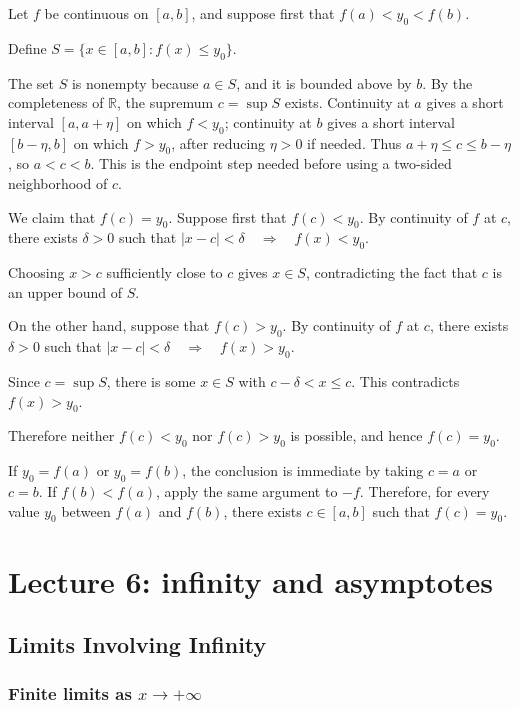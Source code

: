 \documentclass[11pt,a4paper]{article}
\begin{document}
Let \(f\) be continuous on \([a,b]\), and suppose first that
\(f(a)<y_0<f(b).\)

Define \(S=\{x\in[a,b]:f(x)\leq y_0\}.\)

The set \(S\) is nonempty because \(a\in S\), and it is bounded above by
\(b\). By the completeness of \(\mathbb{R}\), the supremum \(c=\sup S\)
exists. Continuity at \(a\) gives a short interval \([a,a+\eta]\) on
which \(f<y_0\); continuity at \(b\) gives a short interval
\([b-\eta,b]\) on which \(f>y_0\), after reducing \(\eta>0\) if needed.
Thus \(a+\eta\le c\le b-\eta\), so \(a<c<b\). This is the endpoint step
needed before using a two-sided neighborhood of \(c\).

We claim that \(f(c)=y_0\). Suppose first that \(f(c)<y_0\). By
continuity of \(f\) at \(c\), there exists \(\delta>0\) such that
\(|x-c|<\delta\quad\Longrightarrow\quad f(x)<y_0.\)

Choosing \(x>c\) sufficiently close to \(c\) gives \(x\in S\),
contradicting the fact that \(c\) is an upper bound of \(S\).

On the other hand, suppose that \(f(c)>y_0\). By continuity of \(f\) at
\(c\), there exists \(\delta>0\) such that
\(|x-c|<\delta\quad\Longrightarrow\quad f(x)>y_0.\)

Since \(c=\sup S\), there is some \(x\in S\) with \(c-\delta<x\leq c\).
This contradicts \(f(x)>y_0\).

Therefore neither \(f(c)<y_0\) nor \(f(c)>y_0\) is possible, and hence
\(f(c)=y_0.\)

If \(y_0=f(a)\) or \(y_0=f(b)\), the conclusion is immediate by taking
\(c=a\) or \(c=b\). If \(f(b)<f(a)\), apply the same argument to \(-f\).
Therefore, for every value \(y_0\) between \(f(a)\) and \(f(b)\), there
exists \(c\in[a,b]\) such that \(f(c)=y_0.\)

\section{Lecture 6: infinity and
asymptotes}\label{lecture-6-infinity-and-asymptotes}

\subsection{Limits Involving Infinity}\label{limits-involving-infinity}

\subsubsection{\texorpdfstring{Finite limits as
\(x\to+\infty\)}{Finite limits as x\textbackslash to+\textbackslash infty}}\label{finite-limits-as-xtoinfty}
\end{document}
